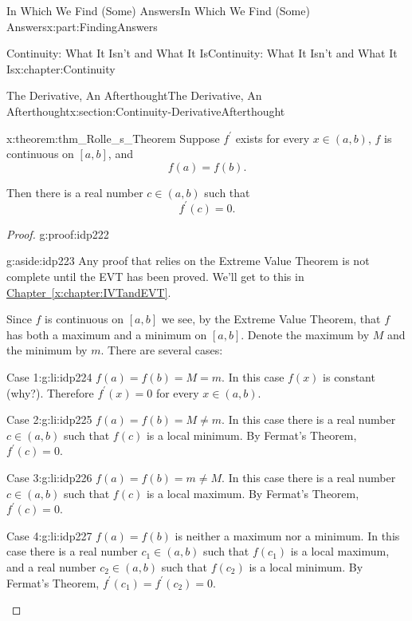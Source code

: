 \documentclass[oneside,10pt,]{book}
\newcommand{\xreffont}{\relax}
\numberwithin{equation}{section}
\begin{document}
\begin{partptx}{In Which We Find (Some) Answers}{}{In Which We Find (Some) Answers}{}{}{x:part:FindingAnswers}
\begin{chapterptx}{Continuity: What It Isn't and What It Is}{}{Continuity: What It Isn't and What It Is}{}{}{x:chapter:Continuity}
\begin{sectionptx}{The Derivative, An Afterthought}{}{The Derivative, An Afterthought}{}{}{x:section:Continuity-DerivativeAfterthought}
\begin{theorem}{}{}{x:theorem:thm_Rolle_s_Theorem}
Suppose \(f^\prime\) exists for every \(x\in(a,b)\), \(f\) is continuous on \([a,b]\), and%
\begin{equation*}
f(a)=f(b) \text{.}
\end{equation*}
%
\par
Then there is a real number \(c\in(a,b)\) such that%
\begin{equation*}
f^\prime(c)=0 \text{.}
\end{equation*}
%
\end{theorem}
\begin{proof}{}{g:proof:idp222}
\begin{aside}{}{g:aside:idp223}%
Any proof that relies on the Extreme Value Theorem is not complete until the EVT has been proved.  We'll get to this in \hyperref[x:chapter:IVTandEVT]{Chapter~{\xreffont\ref{x:chapter:IVTandEVT}}}.%
\end{aside}
Since \(f\) is continuous on \([a,b]\) we see, by the Extreme Value Theorem, that \(f\) has both a maximum and a minimum on \([a,b]\).  Denote the maximum by \(M\) and the minimum by \(m\).  There are several cases:%
\begin{descriptionlist}
\begin{dlimedium}{Case 1:}{g:li:idp224}%
\(f(a)=f(b)=M=m\).  In this case \(f(x)\) is constant (why?).  Therefore \(f^\prime(x)=0\) for every \(x\in(a,b)\).%
\end{dlimedium}%
\begin{dlimedium}{Case 2:}{g:li:idp225}%
\(f(a)=f(b)=M\neq m\). In this case there is a real number \(c\in(a,b)\) such that \(f(c)\) is a local minimum.  By Fermat's Theorem, \(f^\prime(c)=0\).%
\end{dlimedium}%
\begin{dlimedium}{Case 3:}{g:li:idp226}%
\(f(a)=f(b)=m\neq M\). In this case there is a real number \(c\in(a,b)\) such that \(f(c)\) is a local maximum.  By Fermat's Theorem, \(f^\prime(c)=0\).%
\end{dlimedium}%
\begin{dlimedium}{Case 4:}{g:li:idp227}%
\(f(a)=f(b)\) is neither a maximum nor a minimum.  In this case there is a real number \(c_1\in(a,b)\) such that \(f(c_1)\) is a local maximum, and a real number \(c_2\in(a,b)\) such that \(f(c_2)\) is a local minimum.  By Fermat's Theorem, \(f^\prime(c_1)=f^\prime(c_2)=0\).%
\end{dlimedium}%
\end{descriptionlist}
%
\end{proof}

\end{sectionptx}
\end{chapterptx}
\end{partptx}
\end{document}

